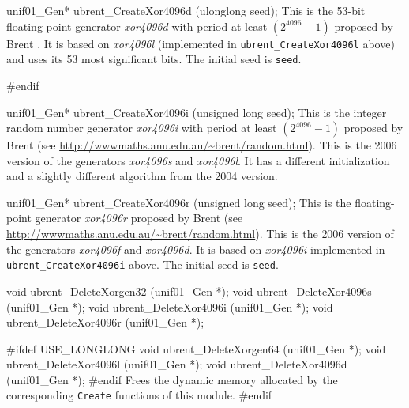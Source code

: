 unif01_Gen* ubrent_CreateXor4096d (ulonglong seed);
\endcode
  \tab This is the 53-bit floating-point generator \textit{xor4096d}
 with period at least $(2^{4096}-1)$ proposed by Brent \cite{rBRE04a}.
  It is based on \textit{xor4096l} (implemented in \texttt{ubrent\_CreateXor4096l}
  above) and uses its 53  most significant bits. The initial seed is \texttt{seed}.
%
 \endtab
\code

#endif
\endcode

\code

unif01_Gen* ubrent_CreateXor4096i (unsigned long seed);
\endcode
  \tab This is the %
  integer random number generator  \textit{xor4096i} with period at least
 $(2^{4096}-1)$ proposed by Brent (see 
  \url{http://wwwmaths.anu.edu.au/~brent/random.html}).  This is the
   {2006 version} of the generators \textit{xor4096s} and
  \textit{xor4096l}. It has a different initialization and a slightly 
  different algorithm from the 2004 version.
%
  \endtab
\code


unif01_Gen* ubrent_CreateXor4096r (unsigned long seed);
\endcode
  \tab This is the floating-point generator \textit{xor4096r} proposed by Brent
  (see \url{http://wwwmaths.anu.edu.au/~brent/random.html}).
  This is the {2006 version} of the generators \textit{xor4096f} and
  \textit{xor4096d}. It is based on \textit{xor4096i} implemented in
  \texttt{ubrent\_CreateXor4096i} above. The initial seed is \texttt{seed}.
%
 \endtab


\code

void ubrent_DeleteXorgen32 (unif01_Gen *);
void ubrent_DeleteXor4096s (unif01_Gen *);
void ubrent_DeleteXor4096i (unif01_Gen *);
void ubrent_DeleteXor4096r (unif01_Gen *);

#ifdef USE_LONGLONG
   void ubrent_DeleteXorgen64 (unif01_Gen *);
   void ubrent_DeleteXor4096l (unif01_Gen *);
   void ubrent_DeleteXor4096d (unif01_Gen *);
#endif
\endcode
  \tab Frees the dynamic memory allocated by the corresponding
  \texttt{Create} functions of this module. \endtab
\code\hide
#endif
\endhide\endcode
